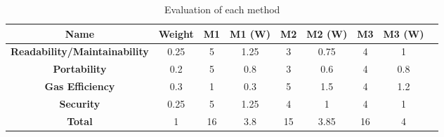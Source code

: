 \begin{table}[H]
	\centering
	\caption{Evaluation of each method}
	\vspace*{-1ex}
	\scriptsize
	\vspace{-1ex}
	\begin{tabular}{|c|c|c|c|c|c|c|c|c|}
        \hline
        \textbf{Name} & \textbf{Weight}  
      & \textbf{M1} & \textbf{M1 (W)}
      & \textbf{M2} & \textbf{M2 (W)} 
      & \textbf{M3} & \textbf{M3 (W)}\\ 
        \hline 
        \textbf{Readability/Maintainability} 
            & 0.25 & 5  & 1.25 & 3 & 0.75 & 4 & 1\\
        \textbf{Portability} 
            & 0.2  & 5  & 0.8  & 3 & 0.6  & 4 & 0.8\\
        \textbf{Gas Efficiency} 
            & 0.3  & 1  & 0.3  & 5 & 1.5  & 4 & 1.2\\
        \textbf{Security} 
            & 0.25 & 5  & 1.25 & 4 & 1    & 4 & 1\\
        \hline
        \textbf{Total} 
            & 1    & 16 & 3.8  & 15 & 3.85 & 16 & 4\\
        \hline
    \end{tabular}
    \label{table:evaluation}
\end{table}
